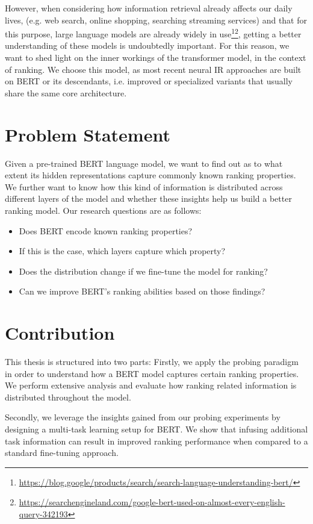 However, when considering how information retrieval already affects our daily lives, (e.g. web search, online shopping, searching streaming services) and that for this purpose, large language models are already widely in use\footnote{\url{https://blog.google/products/search/search-language-understanding-bert/}}\footnote{\url{https://searchengineland.com/google-bert-used-on-almost-every-english-query-342193}}, getting a better understanding of these models is undoubtedly important. For this reason, we want to shed light on the inner workings of the  \citep{devlin-etal-2019-bert} transformer model, in the context of ranking. We choose this model, as most recent neural IR approaches are built on BERT or its descendants, i.e. improved or specialized variants that usually share the same core architecture.

\section{Problem Statement}
Given a pre-trained BERT language model, we want to find out as to what extent its hidden representations capture commonly known ranking properties. We further want to know how this kind of information is distributed across different layers of the model and whether these insights help us build a better ranking model. Our research questions are as follows:
\begin{itemize}
    \item Does BERT encode known ranking properties?
    \item If this is the case, which layers capture which property?
    \item Does the distribution change if we fine-tune the model for ranking?
    \item Can we improve BERT's ranking abilities based on those findings?
\end{itemize}

\section{Contribution}
This thesis is structured into two parts: Firstly, we apply the probing paradigm in order to understand how a BERT model captures certain ranking properties. We perform extensive analysis and evaluate how ranking related information is distributed throughout the model.

Secondly, we leverage the insights gained from our probing experiments by designing a multi-task learning setup for BERT. We show that infusing additional task information can result in improved ranking performance when compared to a standard fine-tuning approach.

